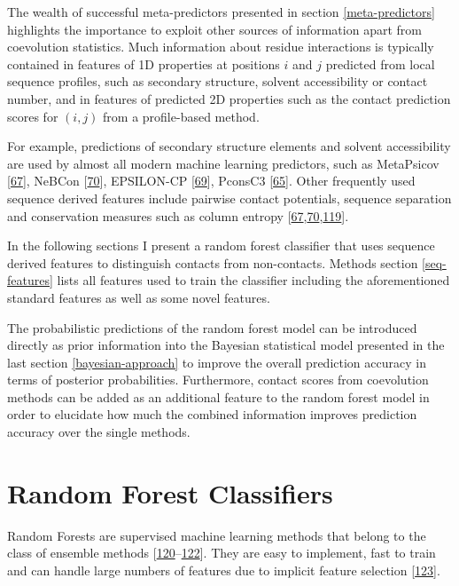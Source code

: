 \documentclass[12pt,a4paper,twoside]{book}
\theoremstyle{definition}
\theoremstyle{definition}
\theoremstyle{remark}
\begin{document}
The wealth of successful meta-predictors presented in section
\ref{meta-predictors} highlights the importance to exploit other sources
of information apart from coevolution statistics. Much information about
residue interactions is typically contained in features of 1D properties
at positions \(i\) and \(j\) predicted from local sequence profiles,
such as secondary structure, solvent accessibility or contact number,
and in features of predicted 2D properties such as the contact
prediction scores for \((i,j)\) from a profile-based method.

For example, predictions of secondary structure elements and solvent
accessibility are used by almost all modern machine learning predictors,
such as MetaPsicov {[}\protect\hyperlink{ref-Jones2015a}{67}{]}, NeBCon
{[}\protect\hyperlink{ref-He2017}{70}{]}, EPSILON-CP
{[}\protect\hyperlink{ref-Stahl2017}{69}{]}, PconsC3
{[}\protect\hyperlink{ref-Skwark2016}{65}{]}. Other frequently used
sequence derived features include pairwise contact potentials, sequence
separation and conservation measures such as column entropy
{[}\protect\hyperlink{ref-Jones2015a}{67},\protect\hyperlink{ref-He2017}{70},\protect\hyperlink{ref-Ma2015a}{119}{]}.

In the following sections I present a random forest classifier that uses
sequence derived features to distinguish contacts from non-contacts.
Methods section \ref{seq-features} lists all features used to train the
classifier including the aforementioned standard features as well as
some novel features.

The probabilistic predictions of the random forest model can be
introduced directly as prior information into the Bayesian statistical
model presented in the last section \ref{bayesian-approach} to improve
the overall prediction accuracy in terms of posterior probabilities.
Furthermore, contact scores from coevolution methods can be added as an
additional feature to the random forest model in order to elucidate how
much the combined information improves prediction accuracy over the
single methods.

\section{Random Forest Classifiers}\label{random-forest-classifiers}

Random Forests are supervised machine learning methods that belong to
the class of ensemble methods
{[}\protect\hyperlink{ref-Ho1998}{120}--\protect\hyperlink{ref-Breiman2001}{122}{]}.
They are easy to implement, fast to train and can handle large numbers
of features due to implicit feature selection
{[}\protect\hyperlink{ref-Menze2009}{123}{]}.
\end{document}
